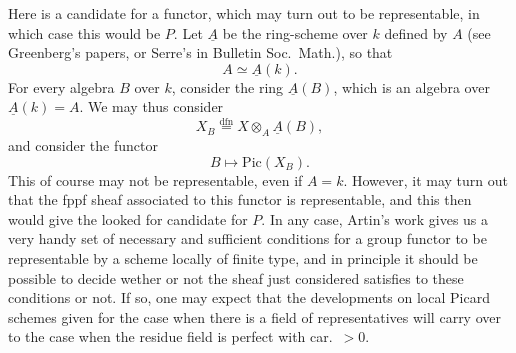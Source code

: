 \documentclass[11pt,a4paper]{article}
\begin{document}
Here is a candidate for a functor, which may turn out to be representable, in
which case this would be $P$. Let $\underline{A}$ be the ring-scheme over $k$
defined by $A$ (see Greenberg's papers, or Serre's in Bulletin Soc.\ Math.),
so that
\begin{equation*}
\tag{23} A \simeq \underline{A}(k) .
\end{equation*}
For every algebra $B$ over $k$, consider the ring $\underline{A}(B)$, which is
an algebra over $\underline{A}(k) = A$. We may thus consider
\[ X_B \overset{\mathrm{dfn}}{=} X \otimes_A \underline{A}(B) , \]
and consider the functor
\begin{equation*}
\tag{24} B \longmapsto \mathrm{Pic}(X_B) .
\end{equation*}
This of course may not be representable, even if $A = k$. However, it may turn
out that the fppf sheaf associated to this functor is representable, and this
then would give the looked for candidate for $P$. In any case, Artin's work
gives us a very handy set of necessary and sufficient conditions for a group
functor to be representable by a scheme locally of finite type, and in
principle it should be possible to decide wether or not the
 sheaf just considered satisfies to these conditions or not.
If so, one may expect that the developments on local Picard schemes given for
the case when there is a field of representatives will carry over to the case
when the residue field is perfect with car.~$> 0$.
\end{document}
